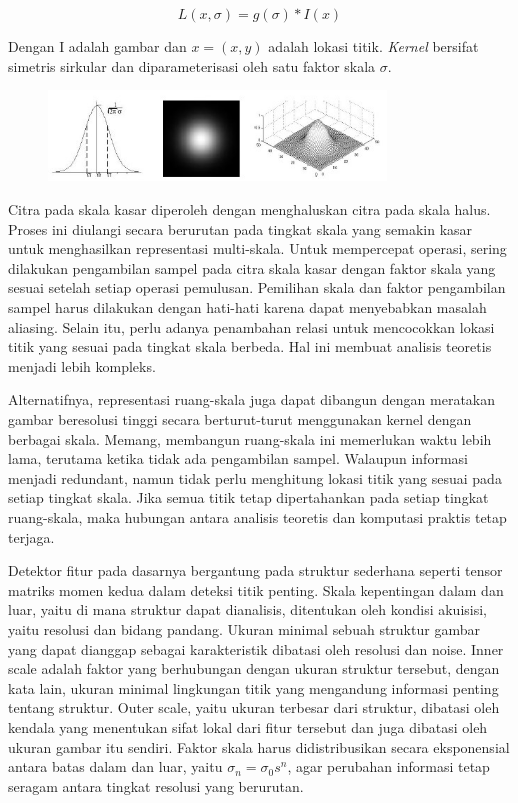 \begin{equation}
L(x,\sigma) = g(\sigma) * I(x)
\label{eq:konvolusi}
\end{equation}

Dengan I adalah gambar dan \(x = (x,y)\) adalah lokasi titik. \emph{Kernel} bersifat simetris sirkular dan diparameterisasi oleh satu faktor skala \(\sigma \).

\begin{figure}
  \centering{}
  \includegraphics[width=0.8\textwidth]{gambar/Uniform Gaussian kernel.jpg}
  \caption{}
\end{figure}

Citra pada skala kasar diperoleh dengan menghaluskan citra pada skala halus. Proses ini diulangi secara berurutan pada tingkat skala yang semakin kasar untuk menghasilkan representasi multi-skala. Untuk mempercepat operasi, sering dilakukan pengambilan sampel pada citra skala kasar dengan faktor skala yang sesuai setelah setiap operasi pemulusan. Pemilihan skala dan faktor pengambilan sampel harus dilakukan dengan hati-hati karena dapat menyebabkan masalah aliasing. Selain itu, perlu adanya penambahan relasi untuk mencocokkan lokasi titik yang sesuai pada tingkat skala berbeda. Hal ini membuat analisis teoretis menjadi lebih kompleks.

Alternatifnya, representasi ruang-skala juga dapat dibangun dengan meratakan gambar beresolusi tinggi secara berturut-turut menggunakan kernel dengan berbagai skala. Memang, membangun ruang-skala ini memerlukan waktu lebih lama, terutama ketika tidak ada pengambilan sampel. Walaupun informasi menjadi redundant, namun tidak perlu menghitung lokasi titik yang sesuai pada setiap tingkat skala. Jika semua titik tetap dipertahankan pada setiap tingkat ruang-skala, maka hubungan antara analisis teoretis dan komputasi praktis tetap terjaga.

Detektor fitur pada dasarnya bergantung pada struktur sederhana seperti tensor matriks momen kedua dalam deteksi titik penting. Skala kepentingan dalam dan luar, yaitu di mana struktur dapat dianalisis, ditentukan oleh kondisi akuisisi, yaitu resolusi dan bidang pandang. Ukuran minimal sebuah struktur gambar yang dapat dianggap sebagai karakteristik dibatasi oleh resolusi dan noise. Inner scale adalah faktor yang berhubungan dengan ukuran struktur tersebut, dengan kata lain, ukuran minimal lingkungan titik yang mengandung informasi penting tentang struktur. Outer scale, yaitu ukuran terbesar dari struktur, dibatasi oleh kendala yang menentukan sifat lokal dari fitur tersebut dan juga dibatasi oleh ukuran gambar itu sendiri. Faktor skala harus didistribusikan secara eksponensial antara batas dalam dan luar, yaitu \(\sigma_{n} = \sigma_{0}s^{n}\), agar perubahan informasi tetap seragam antara tingkat resolusi yang berurutan.

